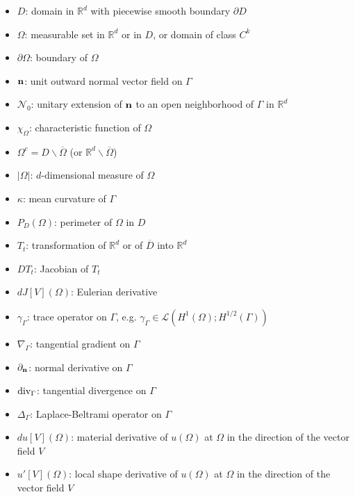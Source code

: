 \documentclass[oneside,11pt]{book}
\numberwithin{equation}{section}
\begin{document}
\begin{itemize}
    \item $D$: domain in $\mathbb{R}^d$ with piecewise smooth boundary $\partial D$
    \item $\Omega$: measurable set in $\mathbb{R}^d$ or in $D$, or domain of class $C^k$
    \item $\partial\Omega$: boundary of $\Omega$
    \item ${\bf n}$: unit outward normal vector field on $\Gamma$
    \item $\mathcal{N}_0$: unitary extension of ${\bf n}$ to an open neighborhood of $\Gamma$ in $\mathbb{R}^d$
    \item $\chi_\Omega$: characteristic function of $\Omega$
    \item $\Omega^c = D\backslash\overline{\Omega}$ (or $\mathbb{R}^d\backslash\overline{\Omega}$)
    \item $|\Omega|$: $d$-dimensional measure of $\Omega$
    \item $\kappa$: mean curvature of $\Gamma$
    \item $P_D(\Omega)$: perimeter of $\Omega$ in $D$
    \item $T_t$: transformation of $\mathbb{R}^d$ or of $\overline{D}$ into $\mathbb{R}^d$
    \item $DT_t$: Jacobian of $T_t$
    \item $dJ[V](\Omega)$: Eulerian derivative
    \item $\gamma_\Gamma$: trace operator on $\Gamma$, e.g. $\gamma_\Gamma\in\mathcal{L}(H^1(\Omega);H^{1/2}(\Gamma))$
    \item $\nabla_\Gamma$: tangential gradient on $\Gamma$
    \item $\partial_{\bf n}$: normal derivative on $\Gamma$
    \item ${\rm div}_\Gamma$: tangential divergence on $\Gamma$
    \item $\Delta_\Gamma$: Laplace-Beltrami operator on $\Gamma$
    \item $du[V](\Omega)$: material derivative of $u(\Omega)$ at $\Omega$ in the direction of the vector field $V$
    \item $u'[V](\Omega)$: local shape derivative of $u(\Omega)$ at $\Omega$ in the direction of the vector field $V$
\end{itemize}
\end{document}
